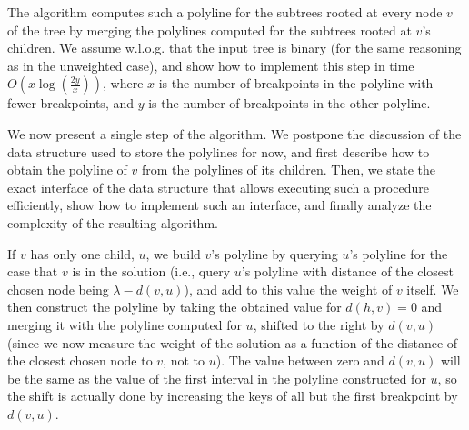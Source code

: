 \documentclass[a4paper,UKenglish]{lipics-v2016}
\theoremstyle{plain}
\begin{document}
The algorithm computes such a polyline for the subtrees rooted at every node $v$ of the tree by merging the polylines computed for the subtrees rooted at $v$'s children. We assume w.l.o.g. that the input tree is binary (for the same reasoning as in the unweighted case), and show how to
implement this step in time $O(x \log (\frac{2y}{x}))$, where $x$ is the number of breakpoints in the polyline with fewer breakpoints, and $y$ is the number of breakpoints in the other polyline.


\vspace{0.04in}  We now present a single step of the algorithm. We postpone the discussion of the data structure used to store the polylines for now, and first describe how to obtain the polyline of $v$ from the polylines of its children. Then, we state the exact interface of the data structure that allows executing such a procedure efficiently, show how to implement such an interface, and finally analyze the complexity of the resulting algorithm.

If $v$ has only one child, $u$, we build $v$'s polyline by querying $u$'s polyline for the case that $v$ is in the solution (i.e., query $u$'s polyline with distance of the closest chosen node being $\lambda-d(v,u)$), and add to this value the weight of $v$ itself. We then construct the polyline by taking the obtained value for $d(h,v)=0$ and merging it with the polyline computed for $u$, shifted to the right by $d(v,u)$ (since we now measure the weight of the solution as a function of the distance of the closest chosen node to $v$, not to $u$). The value between zero and $d(v,u)$ will be the same as the value of the first interval in the polyline constructed for $u$, so the shift is actually done by increasing the keys of all but the first breakpoint by $d(v,u)$.
\end{document}
